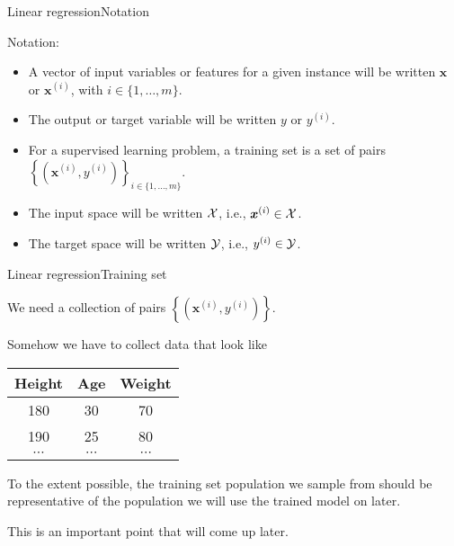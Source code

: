 \documentclass{beamer}
\renewcommand{\vec}[1]{\boldsymbol{#1}}
\begin{document}
\begin{frame}{Linear regression}{Notation}

  Notation:
  \begin{itemize}
  \item A vector of input variables or \alert{features} for a given
    instance will be written $\vec{x}$ or $\vec{x}^{(i)}$, with $i \in
    \{1, \ldots, m\}$.
  \item The output or \alert{target} variable will be written $y$ or
    $y^{(i)}$.
  \item For a supervised learning problem, a \alert{training set} is a
    set of \alert{pairs} $\left\{(\vec{x}^{(i)},y^{(i)})\right\}_{i
      \in \{ 1, \ldots, m \}}$.
  \item The input space will be written ${\cal X}$, i.e.,
    $\vec{x}^{(i)} \in {\cal X}$.
  \item The target space will be written ${\cal Y}$, i.e.,
    $y^{(i)} \in {\cal Y}$.
  \end{itemize}

\end{frame}


\begin{frame}{Linear regression}{Training set}

  We need a collection of pairs $\left\{(\vec{x}^{(i)},y^{(i)})\right\}$.

  \medskip

  Somehow we have to collect data that look like

  \medskip

  \begin{center}
    \begin{tabular}{ccc}
      \textbf{Height} & \textbf{Age} & \textbf{Weight} \\
      \hline
      180 & 30 & 70 \\
      190 & 25 & 80 \\
      $\cdots$ & $\cdots$ & $\cdots$ \\
    \end{tabular}
  \end{center}  

  \medskip

  To the extent possible, the training set population we sample from
  should be representative of the population we will use the trained
  model on later.

  \medskip

  This is an important point that will come up later.
  
\end{frame}
\end{document}
